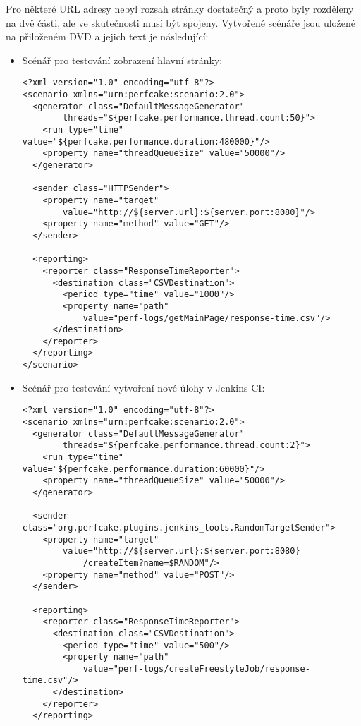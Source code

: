     Pro některé URL adresy nebyl rozsah stránky dostatečný a proto byly
    rozděleny na dvě části, ale ve skutečnosti musí být spojeny.
    Vytvořené scénáře jsou uložené na přiloženém DVD a jejich text je následující:
       \begin{itemize}
        \item Scénář pro testování zobrazení hlavní stránky:
\begin{verbatim}
<?xml version="1.0" encoding="utf-8"?>
<scenario xmlns="urn:perfcake:scenario:2.0">
  <generator class="DefaultMessageGenerator" 
        threads="${perfcake.performance.thread.count:50}">
    <run type="time" value="${perfcake.performance.duration:480000}"/>
    <property name="threadQueueSize" value="50000"/>
  </generator>
  
  <sender class="HTTPSender">
    <property name="target" 
        value="http://${server.url}:${server.port:8080}"/>
    <property name="method" value="GET"/>                                                                                               
  </sender>
  
  <reporting>
    <reporter class="ResponseTimeReporter">
      <destination class="CSVDestination">
        <period type="time" value="1000"/>
        <property name="path" 
            value="perf-logs/getMainPage/response-time.csv"/>
      </destination>
    </reporter>
  </reporting>
</scenario>
\end{verbatim}

        \newpage
        \item Scénář pro testování vytvoření nové úlohy v Jenkins CI:
\begin{verbatim}
<?xml version="1.0" encoding="utf-8"?>
<scenario xmlns="urn:perfcake:scenario:2.0">
  <generator class="DefaultMessageGenerator" 
        threads="${perfcake.performance.thread.count:2}">
    <run type="time" value="${perfcake.performance.duration:60000}"/>                                                                         
    <property name="threadQueueSize" value="50000"/>                                                                                         
  </generator>
              
  <sender class="org.perfcake.plugins.jenkins_tools.RandomTargetSender">
    <property name="target" 
        value="http://${server.url}:${server.port:8080}
            /createItem?name=$RANDOM"/>
    <property name="method" value="POST"/>
  </sender>

  <reporting>
    <reporter class="ResponseTimeReporter">
      <destination class="CSVDestination">
        <period type="time" value="500"/>
        <property name="path" 
            value="perf-logs/createFreestyleJob/response-time.csv"/>
      </destination>
    </reporter>
  </reporting>
    

\end{verbatim}
\end{itemize}
